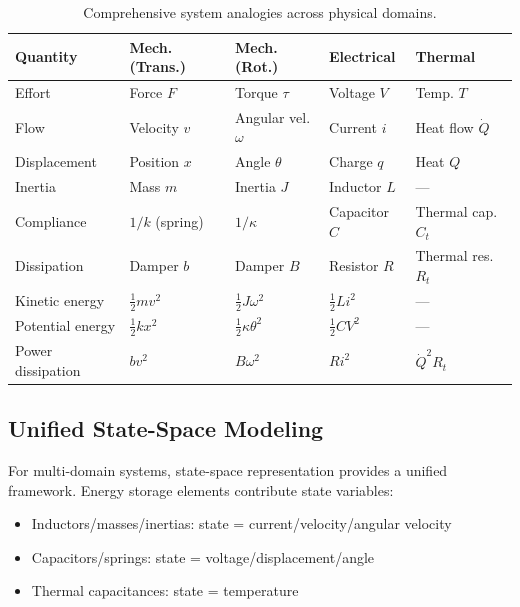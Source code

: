 \begin{table}[htbp]
\centering
\small
\begin{tabular}{lllll}
\toprule
\textbf{Quantity} & \textbf{Mech. (Trans.)} & \textbf{Mech. (Rot.)} & \textbf{Electrical} & \textbf{Thermal} \\
\midrule
Effort & Force $F$ & Torque $\tau$ & Voltage $V$ & Temp. $T$ \\
Flow & Velocity $v$ & Angular vel. $\omega$ & Current $i$ & Heat flow $\dot{Q}$ \\
Displacement & Position $x$ & Angle $\theta$ & Charge $q$ & Heat $Q$ \\
\midrule
Inertia & Mass $m$ & Inertia $J$ & Inductor $L$ & --- \\
Compliance & $1/k$ (spring) & $1/\kappa$ & Capacitor $C$ & Thermal cap. $C_t$ \\
Dissipation & Damper $b$ & Damper $B$ & Resistor $R$ & Thermal res. $R_t$ \\
\midrule
Kinetic energy & $\frac{1}{2}mv^2$ & $\frac{1}{2}J\omega^2$ & $\frac{1}{2}Li^2$ & --- \\
Potential energy & $\frac{1}{2}kx^2$ & $\frac{1}{2}\kappa\theta^2$ & $\frac{1}{2}CV^2$ & --- \\
Power dissipation & $bv^2$ & $B\omega^2$ & $Ri^2$ & $\dot{Q}^2 R_t$ \\
\bottomrule
\end{tabular}
\caption{Comprehensive system analogies across physical domains.}
\label{tab:comprehensive}
\end{table}

\subsection{Unified State-Space Modeling}

For multi-domain systems, state-space representation provides a unified framework. Energy storage elements contribute state variables:
\begin{itemize}
    \item Inductors/masses/inertias: state = current/velocity/angular velocity
    \item Capacitors/springs: state = voltage/displacement/angle
    \item Thermal capacitances: state = temperature
\end{itemize}

